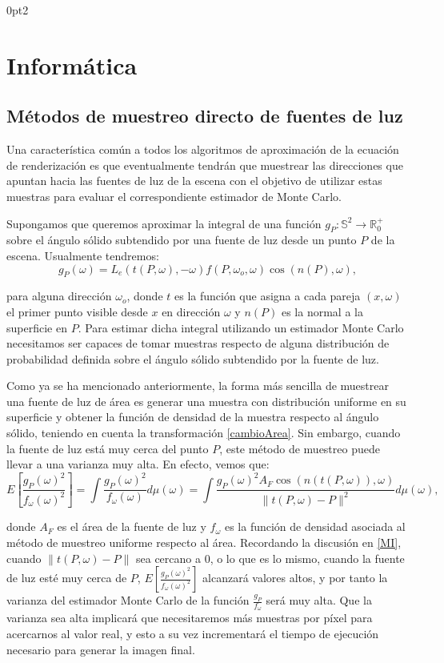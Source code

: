\titlespacing*{\subsection}
  {0pt}{2\baselineskip}{\baselineskip}

\part{Informática}

\chapter{Métodos de muestreo directo de fuentes de luz}\label{MuestreoDirecto}
Una característica común a todos los algoritmos de aproximación de la ecuación de renderización es que eventualmente tendrán que muestrear las direcciones que apuntan hacia las fuentes de luz de la escena con el objetivo de utilizar estas muestras para evaluar el correspondiente estimador de Monte Carlo.

Supongamos que queremos aproximar la integral de una función $g_P:\mathds{S}^2\rightarrow \mathds{R}_0^+$ sobre el ángulo sólido subtendido por una fuente de luz desde un punto $P$ de la escena. Usualmente tendremos:
$$g_P(\omega) = L_e(t(P,\omega), -\omega)f(P,\omega_o,\omega)\cos(n(P),\omega),$$

para alguna dirección $\omega_o$, donde $t$ es la función que asigna a cada pareja $(x,\omega)$ el primer punto visible desde $x$ en dirección $\omega$ y $n(P)$ es la normal a la superficie en $P$. Para estimar dicha integral utilizando un estimador Monte Carlo necesitamos ser capaces de tomar muestras respecto de alguna distribución de probabilidad definida sobre el ángulo sólido subtendido por la fuente de luz.

Como ya se ha mencionado anteriormente, la forma más sencilla de muestrear una fuente de luz de área es generar una muestra con distribución uniforme en su superficie y obtener la función de densidad de la muestra respecto al ángulo sólido, teniendo en cuenta la transformación \ref{cambioArea}. Sin embargo, cuando la fuente de luz está muy cerca del punto $P$, este método de muestreo puede llevar a una varianza muy alta. En efecto, vemos que:
$$E[\frac{g_P(\omega)^2}{f_{\omega}(\omega)^2}] = \int \frac{g_P(\omega)^2}{f_{\omega}(\omega)} d\mu(\omega) = \int \frac{g_P(\omega)^2A_F \cos(n(t(P,\omega)),\omega)}{\|t(P,\omega)-P\|^2} d\mu(\omega),$$

donde $A_F$ es el área de la fuente de luz y $f_{\omega}$ es la función de densidad asociada al método de muestreo uniforme respecto al área. Recordando la discusión en \ref{MI}, cuando $\|t(P,\omega)-P\|$ sea cercano a $0$, o lo que es lo mismo, cuando la fuente de luz esté muy cerca de $P$, $E[\frac{g_P(\omega)^2}{f_{\omega}(\omega)^2}]$ alcanzará valores altos, y por tanto la varianza del estimador Monte Carlo de la función $\frac{g_P}{f_{\omega}}$ será muy alta. Que la varianza sea alta implicará que necesitaremos más muestras por píxel para acercarnos al valor real, y esto a su vez incrementará el tiempo de ejecución necesario para generar la imagen final. 

